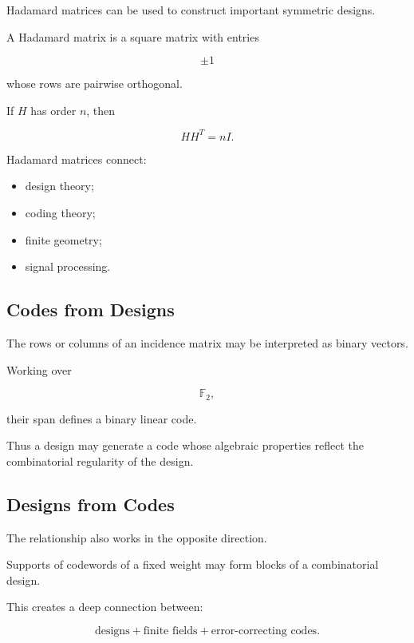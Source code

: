 Hadamard matrices can be used to construct important symmetric designs.

A Hadamard matrix is a square matrix with entries

\[
\pm1
\]

whose rows are pairwise orthogonal.

If \(H\) has order \(n\), then

\[
\boxed{
HH^T=nI.
}
\]

Hadamard matrices connect:

\begin{itemize}
    \item design theory;
    \item coding theory;
    \item finite geometry;
    \item signal processing.
\end{itemize}

\subsection{Codes from Designs}
\label{subsec:codes-from-designs}

The rows or columns of an incidence matrix may be interpreted as binary
vectors.

Working over

\[
\mathbb{F}_2,
\]

their span defines a binary linear code.

Thus a design may generate a code whose algebraic properties reflect
the combinatorial regularity of the design.

\subsection{Designs from Codes}
\label{subsec:designs-from-codes}

The relationship also works in the opposite direction.

Supports of codewords of a fixed weight may form blocks of a
combinatorial design.

This creates a deep connection between:

\[
\boxed{
\text{designs}
+
\text{finite fields}
+
\text{error-correcting codes}.
}
\]

